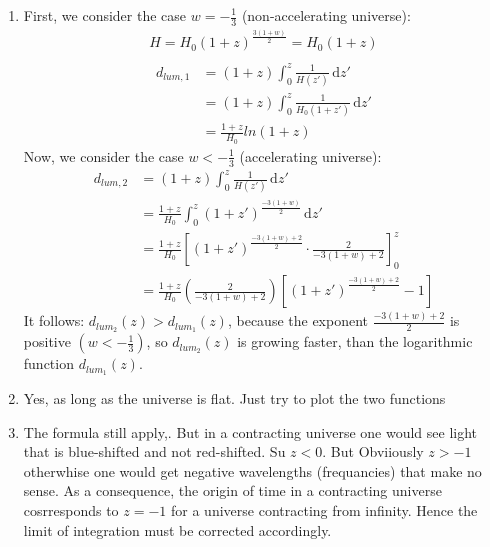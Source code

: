 \documentclass[a4paper,12pt]{article}
\begin{document}
\begin{enumerate}
\begin{enumerate}
			\item
				First, we consider the case $w=-\frac{1}{3}$ (non-accelerating universe):
				\begin{align*}
			H=H_0(1+z)^{\frac{3(1+w)}{2}}=H_0(1+z)\\
\end{align*}	
\begin{align*}
d_{lum,1}&=(1+z)\int_0^z \! \frac{1}{H(z')} \, \mathrm{d}z'\\
			&=(1+z)\int_0^z \! \frac{1}{H_0(1+z')} \, \mathrm{d}z'\\
			&=\frac{1+z}{H_0}ln(1+z)
\end{align*}						
	Now, we consider the case $w<-\frac{1}{3}$ (accelerating universe):
	\begin{align*}
				d_{lum,2}&=(1+z)\int_0^z \! \frac{1}{H(z')} \, \mathrm{d}z'\\
				&=\frac{1+z}{H_0}\int_0^z \! (1+z')^{\frac{-3(1+w)}{2}} \, \mathrm{d}z'\\
				&=\frac{1+z}{H_0}\left[(1+z')^{\frac{-3(1+w)+2}{2}}\cdot \frac{2}{-3(1+w)+2}\right]_0^z\\
				&=\frac{1+z}{H_0}\left(\frac{2}{-3(1+w)+2}\right)\left[(1+z')^{\frac{-3(1+w)+2}{2}}-1\right]
\end{align*}	
It follows:
$d_{lum_2}(z)>d_{lum_1}(z)$, because the exponent $\frac{-3(1+w)+2}{2}$ is positive $(w<-\frac{1}{3})$,
so $d_{lum_2}(z)$ is growing faster, than the logarithmic function $d_{lum_1}(z)$.		
			\item Yes, as long as the universe is flat. Just try to plot the two functions
			\item The formula still apply,. But in a
                          contracting universe one would see light
                          that is blue-shifted and not red-shifted. Su
                          $z<0$. But Obviiously $z>-1$ otherwhise one
                          would get negative wavelengths (frequancies)
                          that make no sense. As a consequence, the
                          origin of time in a contracting universe
                          cosrresponds to $z=-1$ for a universe
                          contracting from infinity. Hence the limit
                          of integration must be corrected accordingly.
		\end{enumerate}
		
	\end{enumerate}
\end{document}

